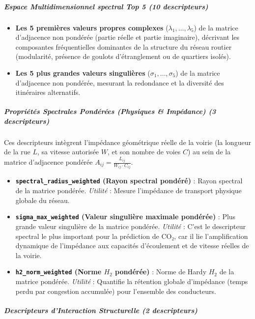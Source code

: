 \documentclass[10pt, a4paper]{article}
\providecommand{\tightlist}{}
\begin{document}
\subparagraph{Espace Multidimensionnel spectral Top 5 (10
descripteurs)}\label{espace-multidimensionnel-spectral-top-5-10-descripteurs}

\begin{itemize}
\tightlist
\item
  \textbf{Les 5 premières valeurs propres complexes}
  (\(\lambda_1, \dots, \lambda_5\)) de la matrice d'adjacence non
  pondérée (partie réelle et partie imaginaire), décrivant les
  composantes fréquentielles dominantes de la structure du réseau
  routier (modularité, présence de goulots d'étranglement ou de
  quartiers isolés).
\item
  \textbf{Les 5 plus grandes valeurs singulières}
  (\(\sigma_1, \dots, \sigma_5\)) de la matrice d'adjacence non
  pondérée, mesurant la redondance et la diversité des itinéraires
  alternatifs.
\end{itemize}

\subparagraph{Propriétés Spectrales Pondérées (Physiques \& Impédance)
(3
descripteurs)}\label{propriuxe9tuxe9s-spectrales-ponduxe9ruxe9es-physiques-impuxe9dance-3-descripteurs}

Ces descripteurs intègrent l'impédance géométrique réelle de la voirie
(la longueur de la rue \(L\), sa vitesse autorisée \(W\), et son nombre
de voies \(C\)) au sein de la matrice d'adjacence pondérée
\(A_{ij} = \frac{L_{ij}}{W_{ij} \cdot C_{ij}}\).

\begin{itemize}
\tightlist
\item
  \textbf{\texttt{spectral\_radius\_weighted} (Rayon spectral pondéré)}
  : Rayon spectral de la matrice pondérée. \emph{Utilité} : Mesure
  l'impédance de transport physique globale du réseau.
\item
  \textbf{\texttt{sigma\_max\_weighted} (Valeur singulière maximale
  pondérée)} : Plus grande valeur singulière de la matrice pondérée.
  \emph{Utilité} : C'est le descripteur spectral le plus important pour
  la prédiction de CO₂, car il lie l'amplification dynamique de
  l'impédance aux capacités d'écoulement et de vitesse réelles de la
  voirie.
\item
  \textbf{\texttt{h2\_norm\_weighted} (Norme \(H_2\) pondérée)} : Norme
  de Hardy \(H_2\) de la matrice pondérée. \emph{Utilité} : Quantifie la
  rétention globale d'impédance (temps perdu par congestion accumulée)
  pour l'ensemble des conducteurs.
\end{itemize}

\subparagraph{Descripteurs d'Interaction Structurelle (2
descripteurs)}\label{descripteurs-dinteraction-structurelle-2-descripteurs}
\end{document}
